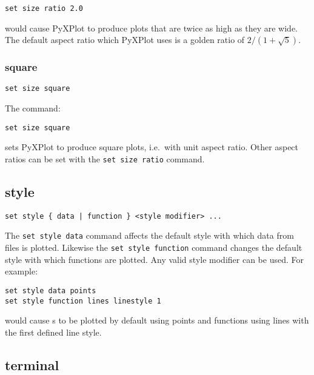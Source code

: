 \begin{verbatim}
set size ratio 2.0
\end{verbatim}

\noindent would cause PyXPlot to produce plots that are twice as high as they
are wide.  The default aspect ratio which PyXPlot uses is a golden ratio of
$2/(1+\sqrt{5})$.


\subsubsection{square}

\begin{verbatim}
set size square
\end{verbatim}

The command:

\begin{verbatim}
set size square
\end{verbatim}

\noindent sets PyXPlot to produce square plots, i.e.\ with unit aspect ratio. Other aspect
ratios can be set with the {\tt set size ratio} command.

\subsection{style}

\begin{verbatim}
set style { data | function } <style modifier> ...
\end{verbatim}

The {\tt set style data} command affects the default style with which data from
files is plotted.  Likewise the {\tt set style function} command changes the
default style with which functions are plotted.  Any valid style modifier can
be used.  For example:

\begin{verbatim}
set style data points
set style function lines linestyle 1
\end{verbatim}

\noindent would cause \datafile s to be plotted by default using points and
functions using lines with the first defined line style.
 
\subsection{terminal}

